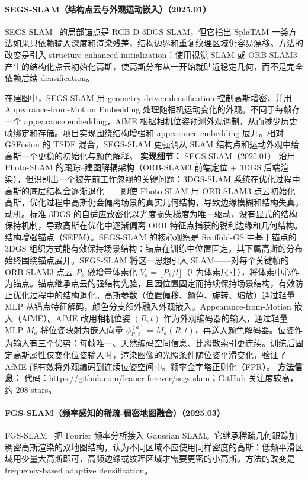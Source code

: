 \paragraph{SEGS-SLAM（结构点云与外观运动嵌入）（2025.01）}
SEGS-SLAM~\cite{2501_05242} 的局部锚点是 RGB-D 3DGS SLAM，但它指出 SplaTAM 一类方法如果只依赖输入深度和渲染残差，结构边界和重复纹理区域仍容易漂移。方法的改变是引入 structure-enhanced initialization：使用视觉 SLAM 或 ORB-SLAM3 产生的结构化点云初始化高斯，使高斯分布从一开始就贴近稳定几何，而不是完全依赖后续 densification。

在建图中，SEGS-SLAM 用 geometry-driven densification 控制高斯增密，并用 Appearance-from-Motion Embedding 处理随相机运动变化的外观。不同于每帧存一个 appearance embedding，AfME 根据相机位姿预测外观调制，从而减少历史帧绑定和存储。项目实现围绕结构增强和 appearance embedding 展开。相对 GSFusion 的 TSDF 混合，SEGS-SLAM 更强调从 SLAM 结构点和运动外观中给高斯一个更稳的初始化与颜色解释。
\textbf{实现细节：} SEGS-SLAM（2025.01） 沿用 Photo-SLAM 的跟踪--建图解耦架构（ORB-SLAM3 前端定位 + 3DGS 后端渲染），但识别出一个被先前工作忽视的关键问题：3DGS-SLAM 系统在优化过程中高斯的底层结构会逐渐退化——即使 Photo-SLAM 用 ORB-SLAM3 点云初始化高斯，优化过程中高斯仍会偏离场景的真实几何结构，导致边缘模糊和结构失真。动机。标准 3DGS 的自适应致密化以光度损失梯度为唯一驱动，没有显式的结构保持机制，导致高斯在优化中逐渐偏离 ORB 特征点捕获的锐利边缘和几何结构。结构增强锚点（SEPM）。SEGS-SLAM 的核心观察是 Scaffold-GS 中基于锚点的 3DGS 组织方式能有效保持场景结构：锚点在训练中位置固定，其下属高斯的分布始终围绕锚点展开。SEGS-SLAM 将这一思想引入 SLAM——对每个关键帧的 ORB-SLAM3 点云 $P_k$ 做增量体素化 $V_k = \lfloor P_k / l \rfloor$（$l$ 为体素尺寸），将体素中心作为锚点。锚点继承点云的强结构先验，且因位置固定而持续保持场景结构，有效防止优化过程中的结构退化。高斯参数（位置偏移、颜色、旋转、缩放）通过轻量 MLP 从锚点特征解码，颜色分支额外融入外观嵌入。Appearance-from-Motion 嵌入（AfME）。AfME 改用相机位姿 $(R, t)$ 作为外观编码器的输入，通过轻量 MLP $M_a$ 将位姿映射为嵌入向量 $\phi^{(a)}_{R,t} = M_a(R, t)$，再送入颜色解码器。位姿作为输入有三个优势：每帧唯一、天然编码空间信息、比离散索引更连续。训练后固定高斯属性仅变化位姿输入时，渲染图像的光照条件随位姿平滑变化，验证了 AfME 能有效将外观编码到连续位姿空间中。频率金字塔正则化（FPR）。
\textbf{方法信息：} 代码：\url{https://github.com/leaner-forever/segs-slam}；GitHub 关注度较高，约 208 stars。



\paragraph{FGS-SLAM（频率感知的稀疏-稠密地图融合）（2025.03）}
FGS-SLAM~\cite{2503_01109} 把 Fourier 频率分析接入 Gaussian SLAM。它继承稀疏几何跟踪加稠密高斯渲染的双地图结构，认为不同区域不应使用同样密度的高斯：低频平滑区域用少量大高斯即可，高频边缘或纹理区域才需要更密的小高斯。方法的改变是 frequency-based adaptive densification。

